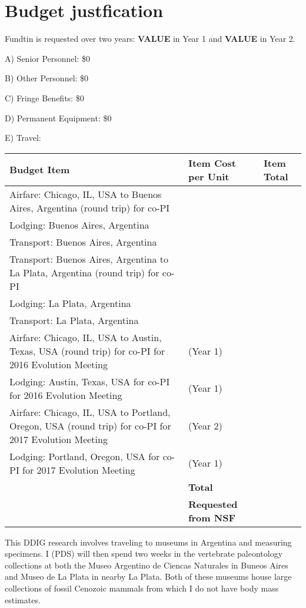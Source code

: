 \documentclass[11pt,letterpaper]{article}
\begin{document}
\setcounter{secnumdepth}{0}
\section{Budget justfication}

Fundtin is requested over two years: \textbf{VALUE} in Year 1 and \textbf{VALUE} in Year 2.

A) Senior Personnel: \$0

B) Other Personnel: \$0

C) Fringe Benefits: \$0

D) Permanent Equipment: \$0

E) Travel:

\begin{tabular}[H]{p{8cm} l l}
  Budget Item & Item Cost per Unit & Item Total \\
  \hline
  Airfare: Chicago, IL, USA to Buenos Aires, Argentina (round trip) for co-PI & & \\
  Lodging: Buenos Aires, Argentina & & \\
  Transport: Buenos Aires, Argentina & & \\
  Transport: Buenos Aires, Argentina to La Plata, Argentina (round trip) for co-PI & & \\
  Lodging: La Plata, Argentina & & \\
  Transport: La Plata, Argentina & & \\
  Airfare: Chicago, IL, USA to Austin, Texas, USA (round trip) for co-PI for 2016 Evolution Meeting & (Year 1) & \\
  Lodging: Austin, Texas, USA for co-PI for 2016 Evolution Meeting & (Year 1) & \\
  Airfare: Chicago, IL, USA to Portland, Oregon, USA (round trip) for co-PI for 2017 Evolution Meeting & (Year 2) & \\
  Lodging: Portland, Oregon, USA for co-PI for 2017 Evolution Meeting & (Year 1) & \\
  & \textbf{Total} & \\
  & \textbf{Requested from NSF} & 
\end{tabular}

This DDIG research involves traveling to museums in Argentina and measuring specimens. I (PDS) will then spend two weeks in the vertebrate paleontology collections at both the Museo Argentino de Ciencas Naturales in Buneos Aires and Museo de La Plata in nearby La Plata. Both of these museums house large collections of fossil Cenozoic mammals from which I do not have body mass estimates.
\end{document}
